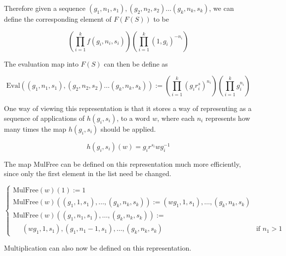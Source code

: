 \documentclass[12pt]{article} %
\theoremstyle{definition}
\theoremstyle{definition}
\theoremstyle{definition}
\theoremstyle{definition}
\theoremstyle{definition}
\theoremstyle{definition}
\begin{document}
Therefore given a sequence $(g_1, n_1, s_1), (g_2, n_2,s_2) \dots (g_k, n_k,s_k)$,
we can define the corresponding element of $F(F(S))$ to be

\begin{equation}
    \left(\prod_{i=1}^k f(g_i, n_i, s_i)\right)\left(\prod_{i=1}^k (1, g_i)^{-n_i}\right)
\end{equation}

The evaluation map into $F(S)$ can then be define as

\begin{equation}
  \text{Eval}((g_1, n_1, s_1), (g_2, n_2,s_2) \dots (g_k, n_k,s_k)) :=
  \left(\prod_{i=1}^k (g_ir^s_i)^{n_i}\right)\left(\prod_{i=1}^k g_i^{n_i}\right)
\end{equation}

One way of viewing this representation is that it stores a way of representing
as a sequence of applications of $h(g_i,s_i)$, to a word $w$, where each $n_i$
represents how many times the map $h(g_i, s_i)$ should be applied.

\begin{equation}
  h(g_i, s_i)(w) = g_ir^{s_i}wg_i^{-1}
\end{equation}

The map MulFree can be defined on this representation much more efficiently,
since only the first
element in the list need be changed.

\begin{equation}
  \begin{cases}
    \text{MulFree}(w)(1) := 1 \\
    \text{MulFree}(w)((g_1, 1, s_1), \dots ,(g_k, n_k, s_k)) := (wg_1, 1, s_1), \dots, (g_k, n_k, s_k)\\
    \text{MulFree}(w)((g_1, n_1, s_1),\dots ,(g_k, n_k, s_k)) := \\
     \ \ \ \ \ \ (wg_1, 1, s_1),(g_1, n_1 - 1, s_1),\dots,(g_k, n_k, s_k) & \text{if }n_1 > 1
  \end{cases}
\end{equation}

Multiplication can also now be defined on this representation.
\end{document}
